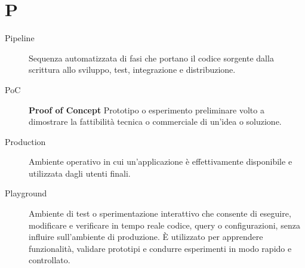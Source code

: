 \section*{P}
\begin{description}
    \item[Pipeline] Sequenza automatizzata di fasi che portano il codice sorgente dalla scrittura allo sviluppo, test, integrazione e distribuzione.
    \item[PoC] \textbf{Proof of Concept} Prototipo o esperimento preliminare volto a dimostrare la fattibilità tecnica o commerciale di un’idea o soluzione.
    \item[Production] Ambiente operativo in cui un’applicazione è effettivamente disponibile e utilizzata dagli utenti finali.
    \item[Playground] Ambiente di test o sperimentazione interattivo che consente di eseguire, modificare e verificare in tempo reale codice, query o configurazioni, senza influire sull’ambiente di produzione. È utilizzato per apprendere funzionalità, validare prototipi e condurre esperimenti in modo rapido e controllato.
\end{description}

